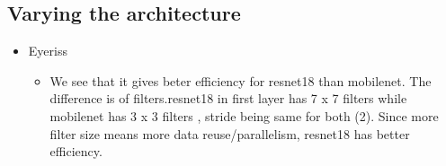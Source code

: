 \documentclass[12pt]{article}
\begin{document}
\subsection*{Varying the architecture}

\begin{itemize}
    \item Eyeriss
     \begin{itemize}
        \item  We see that it gives beter efficiency for resnet18 than mobilenet. The difference is of filters.resnet18 in first layer has 7 x 7 filters while mobilenet has 3 x 3 filters , stride being same for both (2). Since more filter size means more data reuse/parallelism, resnet18 has better efficiency.
    \end{itemize}
\end{itemize}
\end{document}

